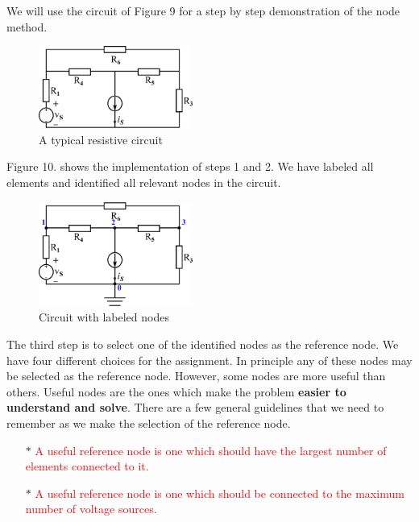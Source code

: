 \documentclass[a4 paper]{article}
\newcommand{\red}[1]{\textcolor{red}{#1}}
\numberwithin{equation}{section}
\newcommand{\0}{\mathbf{0}}
\begin{document}
We will use the circuit of Figure 9 for a step by step demonstration of the node method. 

\begin{figure}[ht!]
  \caption{A typical resistive circuit}
  \centering
  \includegraphics[width=0.45\textwidth]{./images/nodemethod_0}
\end{figure}

Figure 10. shows the implementation of steps 1 and 2. We have labeled all elements and identified all relevant nodes in the circuit.  

\begin{figure}[ht!]
  \caption{Circuit with labeled nodes}
  \centering
  \hspace{5 mm}
  \includegraphics[width=0.45\textwidth]{./images/nodemethod_1}
\end{figure}


The third step is to select one of the identified nodes as the reference node. We have four different choices for the assignment. In principle any of these nodes may be selected as 
the reference node. However, some nodes are more useful than others. Useful nodes are the ones which make the problem {\bf easier to understand and solve}. There are a few general guidelines that we need to remember as we make the selection of the reference node. 


\begin{enumerate} \itemsep1pt \parskip0pt 
  \item[$\ast$] \red{A useful reference node is one which should have the largest number of elements connected to it.}
  \item[$\ast$] \red{A useful reference node is one which should be connected to the maximum number of voltage sources.}
\end{enumerate}
\end{document}
